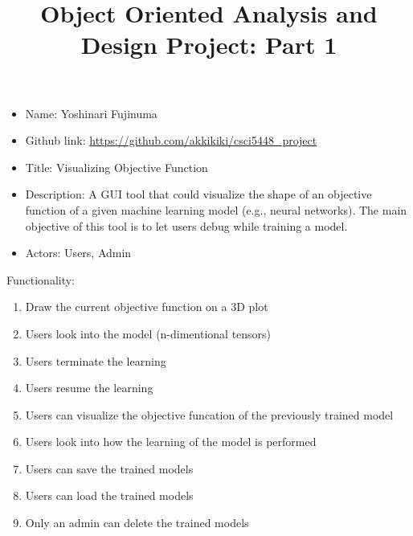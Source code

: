 \documentclass[11pt]{article}
\begin{document}
\vspace{-1cm}
\title{\vspace{-2ex} Object Oriented Analysis and Design Project: Part 1\vspace{-2ex}}
\date{\vspace{-6ex}}
\maketitle

\begin{itemize}
 \item Name: Yoshinari Fujinuma
 \item Github link: \url{https://github.com/akkikiki/csci5448_project}
 \item Title: Visualizing Objective Function
 \item Description: A GUI tool that could visualize the shape of an objective function of a given machine learning model (e.g., neural networks). The main objective of this tool is to let users debug while training a model. 
 \item Actors: Users, Admin
\end{itemize}

Functionality:
\begin{enumerate}[leftmargin=4\parindent]
 \item Draw the current objective function on a 3D plot
 \item Users look into the model (n-dimentional tensors)
 \item Users terminate the learning
 \item Users resume the learning
 \item Users can visualize the objective funcation of the previously trained model
 \item Users look into how the learning of the model is performed
 \item Users can save the trained models
 \item Users can load the trained models
 \item Only an admin can delete the trained models
\end{enumerate}

\end{document}
